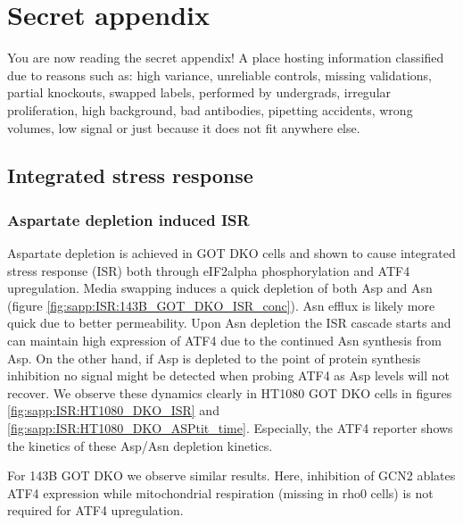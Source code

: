 \chapter{Secret appendix}
You are now reading the secret appendix!
A place hosting information classified due to reasons such as: high variance, unreliable controls, missing validations, partial knockouts, swapped labels, performed by undergrads, irregular proliferation, high background, bad antibodies, pipetting accidents, wrong volumes, low signal or just because it does not fit anywhere else.



\section{Integrated stress response}

\subsection{Aspartate depletion induced ISR}
Aspartate depletion is achieved in GOT DKO cells and shown to cause integrated stress response (ISR) both through eIF2alpha phosphorylation and ATF4 upregulation.
Media swapping induces a quick depletion of both Asp and Asn (figure \ref{fig:sapp:ISR:143B_GOT_DKO_ISR_conc}).
Asn efflux is likely more quick due to better permeability.
Upon Asn depletion the ISR cascade starts and can maintain high expression of ATF4 due to the continued Asn synthesis from Asp.
On the other hand, if Asp is depleted to the point of protein synthesis inhibition no signal might be detected when probing ATF4 as Asp levels will not recover.
We observe these dynamics clearly in HT1080 GOT DKO cells in figures \ref{fig:sapp:ISR:HT1080_DKO_ISR} and \ref{fig:sapp:ISR:HT1080_DKO_ASPtit_time}.
Especially, the ATF4 reporter shows the kinetics of these Asp/Asn depletion kinetics.

For 143B GOT DKO we observe similar results.
Here, inhibition of GCN2 ablates ATF4 expression while mitochondrial respiration (missing in rho0 cells) is not required for ATF4 upregulation.

